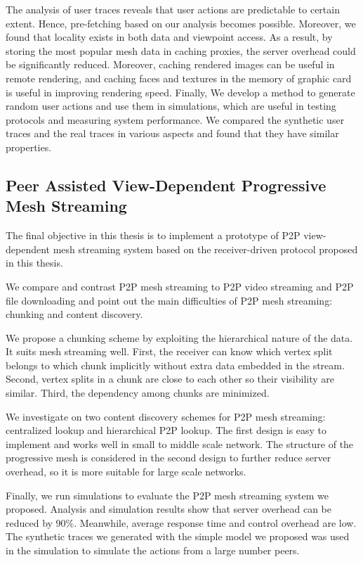    The analysis of user traces reveals that user actions are predictable to certain extent. 
    Hence, pre-fetching based on our analysis becomes possible. Moreover, we found that 
    locality exists in both data and viewpoint access. As a result, 
    by storing the most popular mesh data in caching proxies, 
    the server overhead could be significantly reduced. 
    Moreover, caching rendered images can be useful in remote rendering,
    and caching faces and textures in the memory of graphic card is useful in improving rendering speed.
    Finally, We develop a method to generate random user actions
    and use them in simulations, which are useful in testing protocols and measuring system performance.
    We compared the synthetic user traces and the real traces in various aspects and found
    that they have similar properties.
    
    \subsection{Peer Assisted View-Dependent Progressive Mesh Streaming}
    The final objective in this thesis is to implement a prototype of 
    P2P view-dependent mesh streaming system
    based on the receiver-driven protocol proposed in this thesis.
    
    We compare and contrast P2P mesh streaming to P2P
    video streaming and P2P file downloading and point out
    the main difficulties of P2P mesh streaming:  
    chunking and content discovery.

    We propose a chunking scheme by exploiting the hierarchical 
    nature of the data. It suits mesh streaming well.
    First, the receiver can know which vertex split belongs to
    which chunk implicitly without extra data embedded in the stream.
    Second, vertex splits in a chunk are close to each other so
    their visibility are similar. Third, the dependency among chunks
    are minimized.

    We investigate on two content discovery schemes for P2P
    mesh streaming: centralized lookup and hierarchical P2P lookup.
    The first design is easy to implement and works well in small to 
    middle scale network. The structure of the progressive
    mesh is considered in the second design to further
    reduce server overhead, so it is more suitable for large scale networks. 
    
    Finally, we run simulations 
    to evaluate the P2P
    mesh streaming system we proposed.  
    Analysis and
    simulation results show that server overhead can be
    reduced by 90\%. Meanwhile,  average response time and
    control overhead are low.
    The synthetic traces we generated with the simple model we proposed 
    was used in the simulation to simulate the actions from a large number peers.


